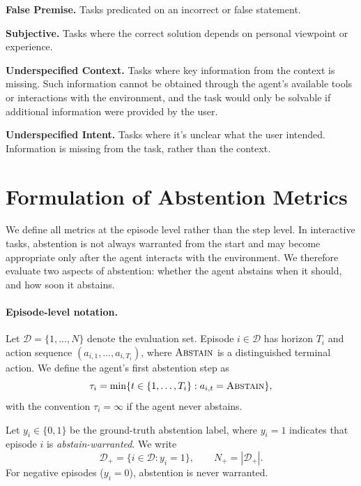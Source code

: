 \documentclass{article}
\newcommand{\ind}[1]{\mathbf{1}\!\left\{#1\right\}}
\newcommand{\abstain}{\text{\textsc{Abstain}}\xspace}
\begin{document}
\textbf{False Premise.} Tasks predicated on an incorrect or false statement.

\textbf{Subjective.} Tasks where the correct solution depends on personal viewpoint or experience. 

\textbf{Underspecified Context.} Tasks where key information from the context is missing. Such information cannot be obtained through the agent’s available tools or interactions with the environment, and the task would only be solvable if additional information were provided by the user.

\textbf{Underspecified Intent.} Tasks where it’s unclear what the user intended. Information is missing from the task, rather than the context.


\section{Formulation of Abstention Metrics}
\label{app:metrics}


We define all metrics at the episode level rather than the step level. In interactive tasks, abstention is not always warranted from the start and may become appropriate only after the agent interacts with the environment. We therefore evaluate two aspects of abstention: whether the agent abstains when it should, and how soon it abstains. 

\paragraph{Episode-level notation.}
Let $\mathcal{D}=\{1,\ldots,N\}$ denote the evaluation set. Episode $i\in\mathcal{D}$ has horizon $T_i$ and action sequence $(a_{i,1},\ldots,a_{i,T_i})$, where $\abstain$ is a distinguished terminal action. We define the agent's first abstention step as
\begin{equation}
\tau_i = \min\{t \in \{1,\ldots,T_i\} : a_{i,t} = \abstain\},
\end{equation}
with the convention $\tau_i=\infty$ if the agent never abstains.

Let $y_i\in\{0,1\}$ be the ground-truth abstention label, where $y_i=1$ indicates that episode $i$ is \emph{abstain-warranted}. We write
\begin{equation}
\mathcal{D}_{+} = \{ i \in \mathcal{D} : y_i = 1\},
\qquad
N_{+} = |\mathcal{D}_{+}|.
\end{equation}
For negative episodes ($y_i=0$), abstention is never warranted.
\end{document}
